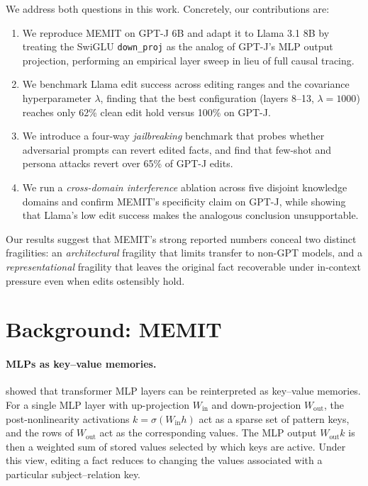 We address both questions in this work. Concretely, our contributions are:
\begin{enumerate}
    \item We reproduce MEMIT on GPT-J 6B and adapt it to Llama 3.1 8B by treating the SwiGLU \texttt{down\_proj} as the analog of GPT-J's MLP output projection, performing an empirical layer sweep in lieu of full causal tracing.
    \item We benchmark Llama edit success across editing ranges and the covariance hyperparameter $\lambda$, finding that the best configuration (layers 8--13, $\lambda{=}1000$) reaches only 62\% clean edit hold versus 100\% on GPT-J.
    \item We introduce a four-way \emph{jailbreaking} benchmark that probes whether adversarial prompts can revert edited facts, and find that few-shot and persona attacks revert over 65\% of GPT-J edits.
    \item We run a \emph{cross-domain interference} ablation across five disjoint knowledge domains and confirm MEMIT's specificity claim on GPT-J, while showing that Llama's low edit success makes the analogous conclusion unsupportable.
\end{enumerate}

Our results suggest that MEMIT's strong reported numbers conceal two distinct fragilities: an \emph{architectural} fragility that limits transfer to non-GPT models, and a \emph{representational} fragility that leaves the original fact recoverable under in-context pressure even when edits ostensibly hold.


\section{Background: MEMIT}
\label{sec:background}

\paragraph{MLPs as key--value memories.}
\citet{geva2021transformer} showed that transformer MLP layers can be reinterpreted as key--value memories. For a single MLP layer with up-projection $W_{\text{in}}$ and down-projection $W_{\text{out}}$, the post-nonlinearity activations $k = \sigma(W_{\text{in}} h)$ act as a sparse set of pattern keys, and the rows of $W_{\text{out}}$ act as the corresponding values. The MLP output $W_{\text{out}} k$ is then a weighted sum of stored values selected by which keys are active. Under this view, editing a fact reduces to changing the values associated with a particular subject--relation key.

